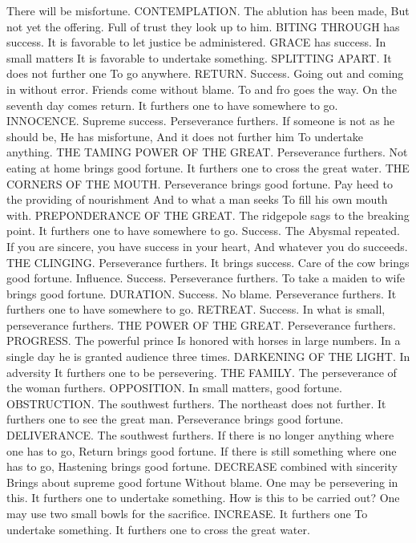 {There will be misfortune.
\or
CONTEMPLATION. The ablution has been made,
But not yet the offering.
Full of trust they look up to him.
\or
BITING THROUGH has success.
It is favorable to let justice be administered.
\or
GRACE has success.
In small matters
It is favorable to undertake something.
\or
SPLITTING APART. It does not further one
To go anywhere.
\or
RETURN. Success.
Going out and coming in without error.
Friends come without blame.
To and fro goes the way.
On the seventh day comes return.
It furthers one to have somewhere to go.
\or
INNOCENCE. Supreme success.
Perseverance furthers.
If someone is not as he should be,
He has misfortune,
And it does not further him
To undertake anything.
\or
THE TAMING POWER OF THE GREAT.
Perseverance furthers.
Not eating at home brings good fortune.
It furthers one to cross the great water.
\or
THE CORNERS OF THE MOUTH.
Perseverance brings good fortune.
Pay heed to the providing of nourishment
And to what a man seeks
To fill his own mouth with.
\or
PREPONDERANCE OF THE GREAT.
The ridgepole sags to the breaking point.
It furthers one to have somewhere to go.
Success.
\or
The Abysmal repeated.
If you are sincere, you have success in your heart,
And whatever you do succeeds.
\or
THE CLINGING. Perseverance furthers.
It brings success.
Care of the cow brings good fortune.
\or
Influence. Success.
Perseverance furthers.
To take a maiden to wife brings good fortune.
\or
DURATION. Success. No blame.
Perseverance furthers.
It furthers one to have somewhere to go.
\or
RETREAT. Success.
In what is small, perseverance furthers.
\or
THE POWER OF THE GREAT. Perseverance furthers.
\or
PROGRESS. The powerful prince
Is honored with horses in large numbers.
In a single day he is granted audience three times.
\or
DARKENING OF THE LIGHT. In adversity
It furthers one to be persevering.
\or
THE FAMILY. The perseverance of the woman furthers.
\or
OPPOSITION. In small matters, good fortune.
\or
OBSTRUCTION. The southwest furthers.
The northeast does not further.
It furthers one to see the great man.
Perseverance brings good fortune.
\or
DELIVERANCE. The southwest furthers.
If there is no longer anything where one has to go,
Return brings good fortune.
If there is still something where one has to go,
Hastening brings good fortune.
\or
DECREASE combined with sincerity
Brings about supreme good fortune
Without blame.
One may be persevering in this.
It furthers one to undertake something.
How is this to be carried out?
One may use two small bowls for the sacrifice.
\or
INCREASE. It furthers one
To undertake something.
It furthers one to cross the great water.
}
